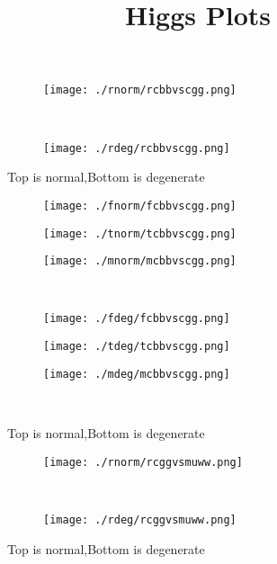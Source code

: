 \documentclass[aps,floats,floatfix,nofootinbib]{revtex4-1}
\begin{document}
\title{Higgs Plots}

\maketitle

\begin{center}
\begin{figure}
\begin{subfigure}{1.0\textwidth}
\texttt{[image: ./rnorm/rcbbvscgg.png]}
\label{}
\end{subfigure}\\
\begin{subfigure}{1.0\textwidth}
\texttt{[image: ./rdeg/rcbbvscgg.png]}
\label{}
\end{subfigure}
\caption{Top is normal,Bottom is degenerate}
\end{figure}
\end{center}

\begin{center}
\begin{figure}
\begin{subfigure}{0.3\textwidth}
\texttt{[image: ./fnorm/fcbbvscgg.png]}
\label{}
\end{subfigure}
\begin{subfigure}{0.3\textwidth}
\texttt{[image: ./tnorm/tcbbvscgg.png]}
\label{}
\end{subfigure}
\begin{subfigure}{0.3\textwidth}
\texttt{[image: ./mnorm/mcbbvscgg.png]}
\label{}
\end{subfigure}\\
\begin{subfigure}{0.3\textwidth}
\texttt{[image: ./fdeg/fcbbvscgg.png]}
\label{}
\end{subfigure}
\begin{subfigure}{0.3\textwidth}
\texttt{[image: ./tdeg/tcbbvscgg.png]}
\label{}
\end{subfigure}
\begin{subfigure}{0.3\textwidth}
\texttt{[image: ./mdeg/mcbbvscgg.png]}
\label{}
\end{subfigure}\\
\caption{Top is normal,Bottom is degenerate}
\end{figure}
\end{center}

\begin{center}
\begin{figure}
\begin{subfigure}{1.0\textwidth}
\texttt{[image: ./rnorm/rcggvsmuww.png]}
\label{}
\end{subfigure}\\
\begin{subfigure}{1.0\textwidth}
\texttt{[image: ./rdeg/rcggvsmuww.png]}
\label{}
\end{subfigure}
\caption{Top is normal,Bottom is degenerate}
\end{figure}
\end{center}
\end{document}
